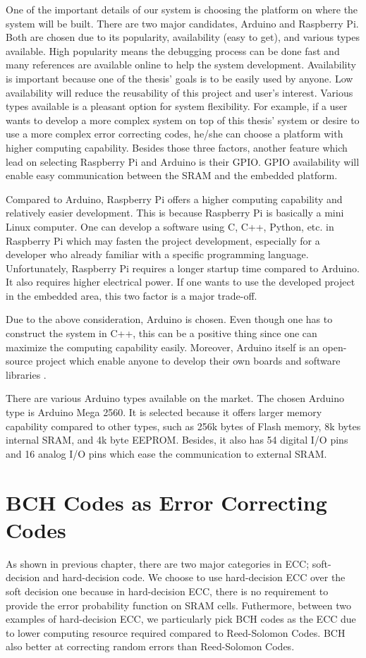 One of the important details of our system is choosing the platform on where the system will be built.
There are two major candidates, Arduino and Raspberry Pi. Both are chosen due to its popularity, availability (easy to get), and various types available. High popularity means the debugging process can be done fast and many references are available online to help the system development. Availability is important because one of the thesis' goals is to be easily used by anyone. Low availability will reduce the reusability of this project and user's interest. Various types available is a pleasant option for system flexibility. For example, if a user wants to develop a more complex system on top of this thesis' system or desire to use a more complex error correcting codes, he/she can choose a platform with higher computing capability.
Besides those three factors, another feature which lead on selecting Raspberry Pi and Arduino is their GPIO. GPIO availability will enable easy communication between the SRAM and the embedded platform.

Compared to Arduino, Raspberry Pi offers a higher computing capability and relatively easier development. This is because Raspberry Pi is basically a mini Linux computer. One can develop a software using C, C++, Python, etc. in Raspberry Pi which may fasten the project development, especially for a developer who already familiar with a specific programming language. Unfortunately, Raspberry Pi requires a longer startup time compared to Arduino. It also requires higher electrical power. If one wants to use the developed project in the embedded area, this two factor is a major trade-off.

Due to the above consideration, Arduino is chosen. Even though one has to construct the system in C++, this can be a positive thing since one can maximize the computing capability easily. Moreover, Arduino itself is an open-source project which enable anyone to develop their own boards and software libraries \cite{arduino}.

There are various Arduino types available on the market. The chosen Arduino type is Arduino Mega 2560. It is selected because it offers larger memory capability compared to other types, such as 256k bytes of Flash memory, 8k bytes internal SRAM, and 4k byte EEPROM.
Besides, it also has 54 digital I/O pins and 16 analog I/O pins which ease the communication to external SRAM.

\section{BCH Codes as Error Correcting Codes}\label{ch:bch}
As shown in previous chapter, there are two major categories in ECC; soft-decision and hard-decision code. We choose to use hard-decision ECC over the soft decision one because in hard-decision ECC, there is no requirement to provide the error probability function on SRAM cells. Futhermore, between two examples of hard-decision ECC, we particularly pick BCH codes as the ECC due to lower computing resource required compared to Reed-Solomon Codes. BCH also better at correcting random errors than Reed-Solomon Codes.

